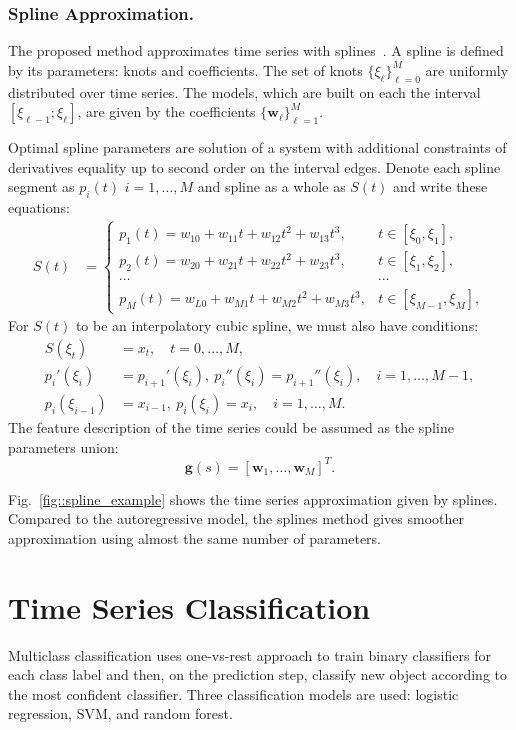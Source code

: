 \documentclass[a4paper,12pt]{article}
\begin{document}
\subsubsection{Spline Approximation.}
The proposed method approximates time series with splines~\cite{deboor1978splines}. A spline is defined by its parameters: knots and coefficients.
The set of knots $\{\xi_\ell\}_{\ell=0}^M$ are uniformly distributed over time series.
The models, which are built on each the interval $[\xi_{\ell-1}; \xi_{\ell}]$, are given by the coefficients $\{\mathbf{w}_\ell\}_{\ell=1}^{M}$.

Optimal spline parameters are solution of a system with additional constraints of derivatives equality up to second order on the interval edges. Denote each spline segment as $p_i(t)$ $i = 1, \dots, M$ and spline as a whole as $S(t)$ and write these equations:
\begin{align*}
S(t) &= \begin{cases}
p_1(t) = w_{10} +w_{11}t + w_{12}t^2 + w_{13}t^3, & t\in [\xi_0, \xi_1],\\
p_2(t) = w_{20} +w_{21}t + w_{22}t^2 + w_{23}t^3, & t\in [\xi_1, \xi_2],\\
\cdots&\cdots \\
p_{M}(t) = w_{L0} +w_{M1}t + w_{M2}t^2 + w_{M3}t^3, & t\in [\xi_{M-1}, \xi_M],					
\end{cases}
\end{align*}
For $S(t)$ to be an interpolatory cubic spline, we must also have conditions:
\begin{align*}
S(\xi_t) &= x_t, \quad t = 0, \dots, M,\\
p_i'(\xi_i) &= p_{i+1}'(\xi_i),\: p_i''(\xi_i) = p_{i+1}''(\xi_i), \quad i = 1, \dots, M-1,\\
p_i(\xi_{i-1}) &= x_{i-1},\: p_i(\xi_i) = x_i, \quad i = 1, \dots, M.
\end{align*}
The feature description of the time series could be assumed as the spline parameters union:
\[
\boldsymbol{g}(s) = \left[\boldsymbol{w}_1, \dots, \boldsymbol{w}_{M}\right]^{T}.
\]

Fig.~\ref{fig::spline_example} shows the time series approximation given by splines. 
Compared to the autoregressive model, the splines method gives smoother approximation using almost the same number of parameters.

\section{Time Series Classification}
Multiclass classification uses one-vs-rest approach to train binary classifiers for each class label and then, on the prediction step, classify new object according to the most confident classifier. Three classification models are used: logistic regression, SVM, and random forest.
\end{document}
